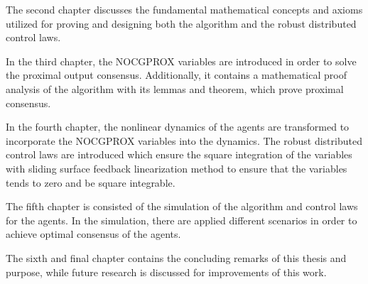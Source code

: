 The second chapter discusses the fundamental mathematical concepts and axioms utilized for proving and designing both the algorithm and the robust distributed control laws.

In the third chapter, the NOCGPROX variables are introduced in order to solve the proximal output consensus. Additionally, it contains a mathematical proof analysis of the algorithm with its lemmas and theorem, which prove proximal consensus.

In the fourth chapter, the nonlinear dynamics of the agents are transformed to incorporate the NOCGPROX variables into the dynamics. The robust distributed control laws are introduced which ensure the square integration of the variables with sliding surface feedback linearization method to ensure that the variables tends to zero and be square integrable.

The fifth chapter is consisted of the simulation of the algorithm and control laws for the agents. In the simulation, there are applied different scenarios in order to achieve optimal consensus of the agents.

The sixth and final chapter contains the concluding remarks of this thesis and purpose, while future research is discussed for improvements of this work.